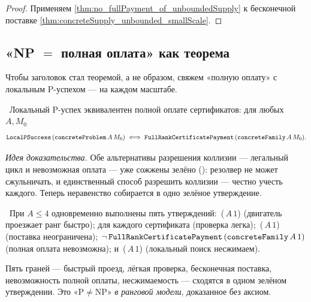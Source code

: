 \begin{proof}
Применяем \cref{thm:no_fullPayment_of_unboundedSupply} к бесконечной поставке
\cref{thm:concreteSupply_unbounded_smallScale}.
\end{proof}

\subsection{«NP $=$ полная оплата» как теорема}

Чтобы заголовок стал теоремой, а не образом, свяжем «полную оплату» с локальным P-успехом --- на
каждом масштабе.

\begin{theorem}\label{thm:concrete_localPSuccess_iff_fullPayment}
\green{}\ Локальный P-успех эквивалентен полной оплате сертификатов: для любых $A, M_0$
\[
   \texttt{LocalPSuccess}\,(\texttt{concreteProblem}\,A\,M_0)
   \iff
   \texttt{FullRankCertificatePayment}\,(\texttt{concreteFamily}\,A\,M_0).
\]
\end{theorem}

\emph{Идея доказательства.} Обе альтернативы разрешения коллизии --- легальный цикл и невозможная
оплата --- уже сожжены зелёно (): резолвер не может
сжульничать, и единственный способ разрешить коллизии --- честно учесть каждого. Теперь неравенство
собирается в одно зелёное утверждение.

\begin{theorem}\label{thm:pnp_rank_separation_smallScale}
\green{}\ При $A \le 4$ одновременно выполнены пять утверждений:
\,(\,$A\,1$) (двигатель проезжает ранг быстро);
 для каждого сертификата (проверка легка);
\,(\,$A\,1$) (поставка неограничена);
$\lnot\,\texttt{FullRankCertificatePayment}\,(\texttt{concreteFamily}\,A\,1)$ (полная оплата
невозможна); и \,(\,$A\,1$) (локальный поиск
несжимаем).
\end{theorem}

Пять граней --- быстрый проезд, лёгкая проверка, бесконечная поставка, невозможность полной оплаты,
несжимаемость --- сходятся в одном зелёном утверждении. Это «$\mathrm{P}\neq\mathrm{NP}$»
\emph{в ранговой модели}, доказанное без аксиом.

